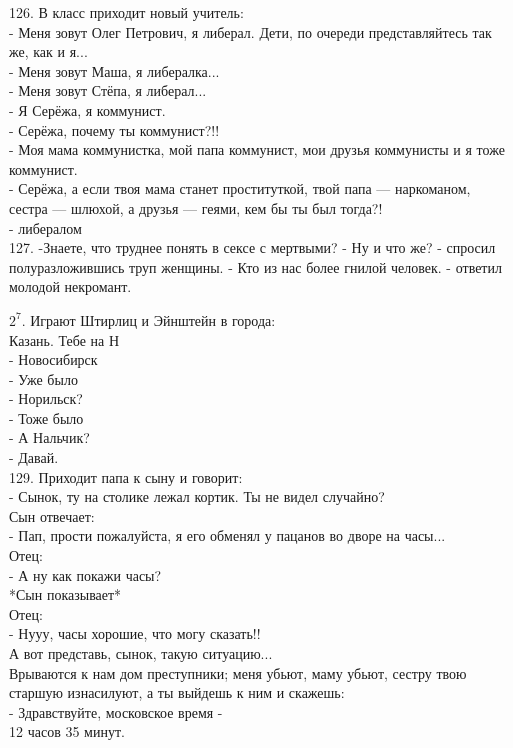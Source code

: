 \documentclass[a4paper,20pt,notitlepage]{extbook}
\begin{document}
	126. В класс приходит новый учитель:\\
	- Меня зовут Олег Петрович, я либерал. Дети, по очереди представляйтесь так же, как и я...\\
	- Меня зовут Маша, я либералка...\\
	- Меня зовут Стёпа, я либерал...\\
	- Я Серёжа, я коммунист.\\
	- Серёжа, почему ты коммунист?!!\\
	- Моя мама коммунистка, мой папа коммунист, мои друзья коммунисты и я тоже коммунист.\\
	- Серёжа, а если твоя мама станет проституткой, твой папа — наркоманом, сестра — шлюхой, а друзья — геями, кем бы ты был тогда?!\\
	- либералом\\
	
	127. -Знаете, что труднее понять в сексе с мертвыми? 
		- Ну и что же? - спросил полуразложившись труп женщины. 
		- Кто из нас более гнилой человек. - ответил молодой некромант.
	
	$2^7$. Играют Штирлиц и Эйнштейн в города:\\
	Казань. Тебе на Н\\
	- Новосибирск\\
	- Уже было\\
	- Норильск?\\
	- Тоже было\\
	- А Нальчик?\\
	- Давай.\\
	
	129. Приходит папа к сыну и говорит:\\
	- Сынок, ту на столике лежал кортик. Ты не видел случайно?\\
	Сын отвечает:\\
	- Пап, прости пожалуйста, я его обменял у пацанов во дворе на часы...\\
	Отец:\\
	- А ну как покажи часы?\\
	*Сын показывает*\\
	Отец:\\
	- Нууу, часы хорошие, что могу сказать!!\\
	А вот представь, сынок, такую ситуацию...\\
	Врываются к нам дом преступники; меня убьют, маму убьют, сестру твою старшую изнасилуют, а ты выйдешь к ним и скажешь:\\
	- Здравствуйте, московское время -\\
	12 часов 35 минут.\\
	
\end{document}
